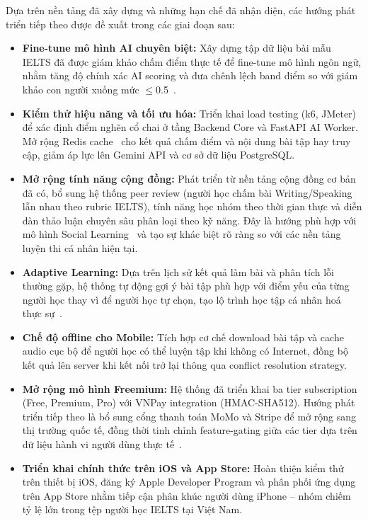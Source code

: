 Dựa trên nền tảng đã xây dựng và những hạn chế đã nhận diện, các hướng phát triển tiếp theo được đề xuất trong các giai đoạn sau:

\begin{itemize}
    \item \textbf{Fine-tune mô hình AI chuyên biệt:} Xây dựng tập dữ liệu bài mẫu IELTS đã được giám khảo chấm điểm thực tế để fine-tune mô hình ngôn ngữ, nhằm tăng độ chính xác AI scoring và đưa chênh lệch band điểm so với giám khảo con người xuống mức $\leq$0.5~\cite{le2023nlp}.

    \item \textbf{Kiểm thử hiệu năng và tối ưu hóa:} Triển khai load testing (k6, JMeter) để xác định điểm nghẽn cổ chai ở tầng Backend Core và FastAPI AI Worker. Mở rộng Redis cache~\cite{redis-docs} cho kết quả chấm điểm và nội dung bài tập hay truy cập, giảm áp lực lên Gemini API và cơ sở dữ liệu PostgreSQL.

    \item \textbf{Mở rộng tính năng cộng đồng:} Phát triển từ nền tảng cộng đồng cơ bản đã có, bổ sung hệ thống peer review (người học chấm bài Writing/Speaking lẫn nhau theo rubric IELTS), tính năng học nhóm theo thời gian thực và diễn đàn thảo luận chuyên sâu phân loại theo kỹ năng. Đây là hướng phù hợp với mô hình Social Learning~\cite{vygotsky1978mind} và tạo sự khác biệt rõ ràng so với các nền tảng luyện thi cá nhân hiện tại.

    \item \textbf{Adaptive Learning:} Dựa trên lịch sử kết quả làm bài và phân tích lỗi thường gặp, hệ thống tự động gợi ý bài tập phù hợp với điểm yếu của từng người học thay vì để người học tự chọn, tạo lộ trình học tập cá nhân hoá thực sự~\cite{tran2022elearning}.

    \item \textbf{Chế độ offline cho Mobile:} Tích hợp cơ chế download bài tập và cache audio cục bộ để người học có thể luyện tập khi không có Internet, đồng bộ kết quả lên server khi kết nối trở lại thông qua conflict resolution strategy.

    \item \textbf{Mở rộng mô hình Freemium:} Hệ thống đã triển khai ba tier subscription (Free, Premium, Pro) với VNPay integration (HMAC-SHA512). Hướng phát triển tiếp theo là bổ sung cổng thanh toán MoMo và Stripe để mở rộng sang thị trường quốc tế, đồng thời tinh chỉnh feature-gating giữa các tier dựa trên dữ liệu hành vi người dùng thực tế~\cite{statista-elearning}.

    \item \textbf{Triển khai chính thức trên iOS và App Store:} Hoàn thiện kiểm thử trên thiết bị iOS, đăng ký Apple Developer Program và phân phối ứng dụng trên App Store nhằm tiếp cận phân khúc người dùng iPhone -- nhóm chiếm tỷ lệ lớn trong tệp người học IELTS tại Việt Nam.
\end{itemize}

